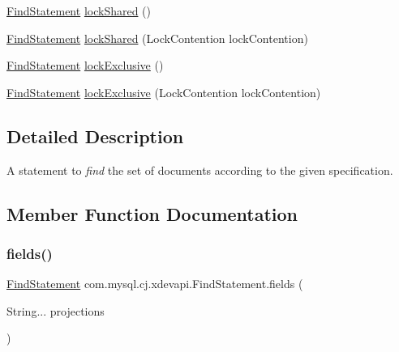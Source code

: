 \begin{DoxyCompactItemize}
\item 
\mbox{\hyperlink{interfacecom_1_1mysql_1_1cj_1_1xdevapi_1_1_find_statement}{Find\+Statement}} \mbox{\hyperlink{interfacecom_1_1mysql_1_1cj_1_1xdevapi_1_1_find_statement_aaa2bf84ac564387d2909bf201aa57fc1}{lock\+Shared}} ()
\item 
\mbox{\hyperlink{interfacecom_1_1mysql_1_1cj_1_1xdevapi_1_1_find_statement}{Find\+Statement}} \mbox{\hyperlink{interfacecom_1_1mysql_1_1cj_1_1xdevapi_1_1_find_statement_a462ecf53c1ba4a9d6e0d29a2a244bd62}{lock\+Shared}} (Lock\+Contention lock\+Contention)
\item 
\mbox{\hyperlink{interfacecom_1_1mysql_1_1cj_1_1xdevapi_1_1_find_statement}{Find\+Statement}} \mbox{\hyperlink{interfacecom_1_1mysql_1_1cj_1_1xdevapi_1_1_find_statement_af7d8cbf89d9c5c6caf6c0d89490b5d06}{lock\+Exclusive}} ()
\item 
\mbox{\hyperlink{interfacecom_1_1mysql_1_1cj_1_1xdevapi_1_1_find_statement}{Find\+Statement}} \mbox{\hyperlink{interfacecom_1_1mysql_1_1cj_1_1xdevapi_1_1_find_statement_a45a87d77da29808cb82617f003de584d}{lock\+Exclusive}} (Lock\+Contention lock\+Contention)
\end{DoxyCompactItemize}


\subsection{Detailed Description}
A statement to {\itshape find} the set of documents according to the given specification. 

\subsection{Member Function Documentation}
\mbox{\label{interfacecom_1_1mysql_1_1cj_1_1xdevapi_1_1_find_statement_a31dcef3b4852a5eb361a03b549eddeaf}} 
\subsubsection{\texorpdfstring{fields()}{fields()}\hspace{0.1cm}{\footnotesize\ttfamily [1/2]}}
{\footnotesize\ttfamily \mbox{\hyperlink{interfacecom_1_1mysql_1_1cj_1_1xdevapi_1_1_find_statement}{Find\+Statement}} com.\+mysql.\+cj.\+xdevapi.\+Find\+Statement.\+fields (\begin{DoxyParamCaption}\item[{String...}]{projections }\end{DoxyParamCaption})}

